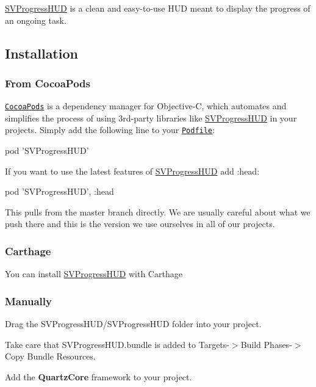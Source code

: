 {\ttfamily \mbox{\hyperlink{interface_s_v_progress_h_u_d}{S\+V\+Progress\+H\+UD}}} is a clean and easy-\/to-\/use H\+UD meant to display the progress of an ongoing task.



\subsection*{Installation}

\subsubsection*{From Cocoa\+Pods}

\href{http://cocoapods.org}{\tt Cocoa\+Pods} is a dependency manager for Objective-\/C, which automates and simplifies the process of using 3rd-\/party libraries like {\ttfamily \mbox{\hyperlink{interface_s_v_progress_h_u_d}{S\+V\+Progress\+H\+UD}}} in your projects. Simply add the following line to your \href{http://guides.cocoapods.org/using/using-cocoapods.html}{\tt Podfile}\+:


\begin{DoxyCode}
pod 'SVProgressHUD'
\end{DoxyCode}


If you want to use the latest features of {\ttfamily \mbox{\hyperlink{interface_s_v_progress_h_u_d}{S\+V\+Progress\+H\+UD}}} add {\ttfamily \+:head}\+:


\begin{DoxyCode}
pod 'SVProgressHUD', :head
\end{DoxyCode}


This pulls from the {\ttfamily master} branch directly. We are usually careful about what we push there and this is the version we use ourselves in all of our projects.

\subsubsection*{Carthage}

\href{https://github.com/TransitApp/SVProgressHUD}{\tt }

You can install \mbox{\hyperlink{interface_s_v_progress_h_u_d}{S\+V\+Progress\+H\+UD}} with Carthage

\subsubsection*{Manually}


\begin{DoxyItemize}
\item Drag the {\ttfamily S\+V\+Progress\+H\+U\+D/\+S\+V\+Progress\+H\+UD} folder into your project.
\item Take care that {\ttfamily S\+V\+Progress\+H\+U\+D.\+bundle} is added to {\ttfamily Targets-\/$>$Build Phases-\/$>$Copy Bundle Resources}.
\item Add the {\bfseries Quartz\+Core} framework to your project.
\end{DoxyItemize}


